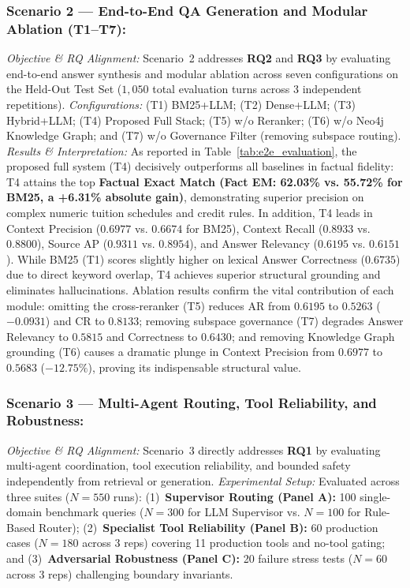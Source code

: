 \subsubsection{Scenario 2 --- End-to-End QA Generation and Modular Ablation (T1--T7):}
\emph{Objective \& RQ Alignment:} Scenario~2 addresses \textbf{RQ2} and \textbf{RQ3} by evaluating end-to-end answer synthesis and modular ablation across seven configurations on the Held-Out Test Set ($1,050$ total evaluation turns across 3 independent repetitions).
\emph{Configurations:} (T1) BM25+LLM; (T2) Dense+LLM; (T3) Hybrid+LLM; (T4) Proposed \system{} Full Stack; (T5) w/o Reranker; (T6) w/o Neo4j Knowledge Graph; and (T7) w/o Governance Filter (removing subspace routing).
\emph{Results \& Interpretation:} As reported in Table~\ref{tab:e2e_evaluation}, the proposed full system (T4) decisively outperforms all baselines in factual fidelity: T4 attains the top \textbf{Factual Exact Match (Fact EM: 62.03\% vs. 55.72\% for BM25, a +6.31\% absolute gain)}, demonstrating superior precision on complex numeric tuition schedules and credit rules. In addition, T4 leads in Context Precision ($0.6977$ vs. $0.6674$ for BM25), Context Recall ($0.8933$ vs. $0.8800$), Source AP ($0.9311$ vs. $0.8954$), and Answer Relevancy ($0.6195$ vs. $0.6151$). While BM25 (T1) scores slightly higher on lexical Answer Correctness ($0.6735$) due to direct keyword overlap, T4 achieves superior structural grounding and eliminates hallucinations. Ablation results confirm the vital contribution of each module: omitting the cross-reranker (T5) reduces AR from $0.6195$ to $0.5263$ ($-0.0931$) and CR to $0.8133$; removing subspace governance (T7) degrades Answer Relevancy to $0.5815$ and Correctness to $0.6430$; and removing Knowledge Graph grounding (T6) causes a dramatic plunge in Context Precision from $0.6977$ to $0.5683$ ($-12.75\%$), proving its indispensable structural value.

\subsubsection{Scenario 3 --- Multi-Agent Routing, Tool Reliability, and Robustness:}
\emph{Objective \& RQ Alignment:} Scenario~3 directly addresses \textbf{RQ1} by evaluating multi-agent coordination, tool execution reliability, and bounded safety independently from retrieval or generation.
\emph{Experimental Setup:} Evaluated across three suites ($N=550$ runs): (1)~\textbf{Supervisor Routing (Panel A):} 100 single-domain benchmark queries ($N=300$ for LLM Supervisor vs. $N=100$ for Rule-Based Router); (2)~\textbf{Specialist Tool Reliability (Panel B):} 60 production cases ($N=180$ across 3 reps) covering 11 production tools and no-tool gating; and (3)~\textbf{Adversarial Robustness (Panel C):} 20 failure stress tests ($N=60$ across 3 reps) challenging boundary invariants.

